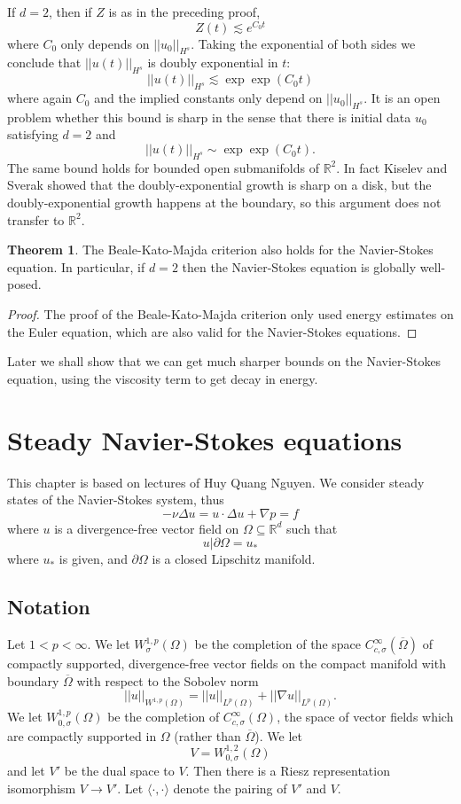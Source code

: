 \documentclass[12pt]{book}
\newcommand{\RR}{\mathbb{R}}
\theoremstyle{definition}
\newtheorem{theorem}{Theorem}[chapter]
\begin{document}
If $d = 2$, then if $Z$ is as in the preceding proof,
$$Z(t) \lesssim e^{C_0t}$$
where $C_0$ only depends on $||u_0||_{H^s}$.
Taking the exponential of both sides we conclude that $||u(t)||_{H^s}$ is doubly exponential in $t$:
$$||u(t)||_{H^s} \lesssim \exp \exp(C_0t)$$
where again $C_0$ and the implied constants only depend on $||u_0||_{H^s}$.
It is an open problem whether this bound is sharp in the sense that there is initial data $u_0$ satisfying $d = 2$ and
$$||u(t)||_{H^s} \sim \exp \exp(C_0 t).$$
The same bound holds for bounded open submanifolds of $\RR^2$.
In fact Kiselev and Sverak showed that the doubly-exponential growth is sharp on a disk, but the doubly-exponential growth happens at the boundary, so this argument does not transfer to $\RR^2$.

\begin{theorem}
The Beale-Kato-Majda criterion also holds for the Navier-Stokes equation.
In particular, if $d = 2$ then the Navier-Stokes equation is globally well-posed.
\end{theorem}
\begin{proof}
The proof of the Beale-Kato-Majda criterion only used energy estimates on the Euler equation, which are also valid for the Navier-Stokes equations.
\end{proof}

Later we shall show that we can get much sharper bounds on the Navier-Stokes equation, using the viscosity term to get decay in energy.

\chapter{Steady Navier-Stokes equations}
This chapter is based on lectures of Huy Quang Nguyen.
We consider steady states of the Navier-Stokes system, thus
$$-\nu \Delta u = u \cdot \Delta u + \nabla p = f$$
where $u$ is a divergence-free vector field on $\Omega \subseteq \RR^d$ such that
$$u|\partial \Omega = u_*$$
where $u_*$ is given, and $\partial \Omega$ is a closed Lipschitz manifold.

\section{Notation}
Let $1 < p < \infty$. We let $W^{1,p}_\sigma(\Omega)$ be the completion of the space $C_{c,\sigma}^\infty(\overline \Omega)$ of compactly supported, divergence-free vector fields on the compact manifold with boundary $\overline \Omega$ with respect to the Sobolev norm
$$||u||_{W^{1,p}(\Omega)} = ||u||_{L^p(\Omega)} + ||\nabla u||_{L^p(\Omega)}.$$
We let $W^{1,p}_{0,\sigma}(\Omega)$ be the completion of $C_{c,\sigma}^\infty(\Omega)$, the space of vector fields which are compactly supported in $\Omega$ (rather than $\overline \Omega$).
We let
$$V = W^{1,2}_{0,\sigma}(\Omega)$$
and let $V'$ be the dual space to $V$.
Then there is a Riesz representation isomorphism $V \to V'$.
Let $\langle \cdot, \cdot \rangle$ denote the pairing of $V'$ and $V$.
\end{document}
